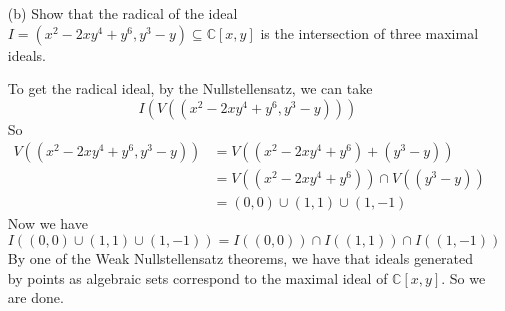 \documentclass{article}
\begin{document}
\begin{itemize}
        \item [(b)] Show that the radical of the ideal $I = (x^{2} - 2xy^{4} + y^{6}, y^{3} - y) \subseteq \mathbb{C}[x, y]$ is the intersection of three maximal ideals.
            \begin{answer}
                To get the radical ideal, by the Nullstellensatz, we can take 
                    \begin{equation*}
                        I(V((x^{2} - 2xy^{4} + y^{6}, y^{3} - y)))
                    \end{equation*}
                So
                    \begin{align*}
                        V((x^{2} - 2xy^{4} + y^{6}, y^{3} - y)) &= V((x^{2} - 2xy^{4} + y^{6}) + (y^{3} - y))       \\
                                                                &= V((x^{2} - 2xy^{4} + y^{6})) \cap V((y^{3} - y)) \\
                                                                &= (0, 0) \cup (1, 1) \cup (1, -1)                    
                    \end{align*}
                Now we have
                    \begin{equation*}
                        I((0, 0) \cup (1, 1) \cup (1, -1)) = I((0, 0)) \cap I((1, 1)) \cap I((1, -1))
                    \end{equation*} 
                By one of the Weak Nullstellensatz theorems, we have that ideals generated by points as algebraic sets correspond to the maximal ideal of $\mathbb{C}[x, y]$. So we are done.
            \end{answer}
    \end{itemize}
\end{document}
